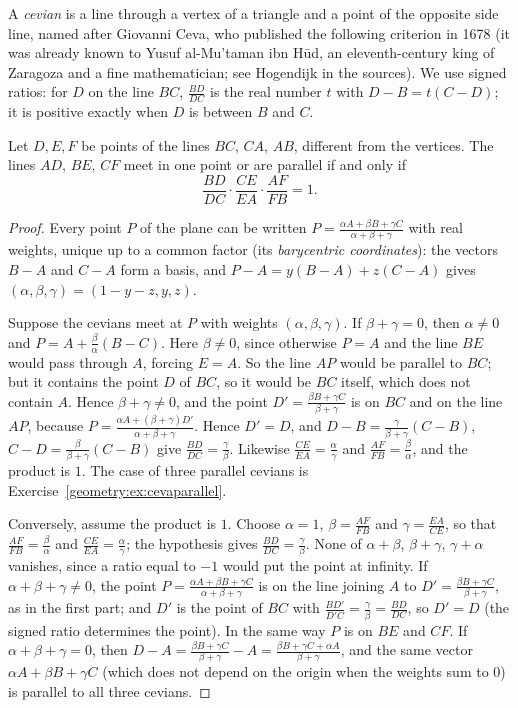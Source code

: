 A \emph{cevian} is a line through a vertex of a triangle and a point of the opposite side line, named after Giovanni Ceva, who
published the following criterion in 1678 (it was already known to Yusuf al-Mu'taman ibn H\=ud, an eleventh-century king of Zaragoza
and a fine mathematician; see Hogendijk in the sources). We
use signed ratios: for $D$ on the line $BC$, $\frac{BD}{DC}$ is the real number $t$ with $D-B=t(C-D)$; it is positive exactly when $D$ is
between $B$ and $C$.

\begin{theorem}[Ceva]\label{geometry:thm:ceva}
Let $D,E,F$ be points of the lines $BC$, $CA$, $AB$, different from the vertices. The lines $AD$, $BE$, $CF$ meet in one point or are
parallel if and only if
\[
\frac{BD}{DC}\cdot\frac{CE}{EA}\cdot\frac{AF}{FB}=1 .
\]
\end{theorem}
\begin{proof}
Every point $P$ of the plane can be written $P=\frac{\alpha A+\beta B+\gamma C}{\alpha+\beta+\gamma}$ with real weights, unique up to a
common factor (its \emph{barycentric coordinates}): the vectors $B-A$ and $C-A$ form a basis, and $P-A=y(B-A)+z(C-A)$ gives
$(\alpha,\beta,\gamma)=(1-y-z,y,z)$.

Suppose the cevians meet at $P$ with weights $(\alpha,\beta,\gamma)$. If $\beta+\gamma=0$, then $\alpha\ne0$ and $P=A+\frac\beta\alpha(B-C)$.
Here $\beta\ne0$, since otherwise $P=A$ and the line $BE$ would pass through $A$, forcing $E=A$. So the line $AP$ would be parallel to
$BC$; but it contains the point $D$ of $BC$, so it would be $BC$ itself, which does not contain $A$. Hence $\beta+\gamma\neq0$, and the point $D'=\frac{\beta B+\gamma C}{\beta+\gamma}$ is on $BC$ and on the line $AP$, because
$P=\frac{\alpha A+(\beta+\gamma)D'}{\alpha+\beta+\gamma}$. Hence $D'=D$, and $D-B=\frac{\gamma}{\beta+\gamma}(C-B)$, $C-D=\frac{\beta}{\beta+\gamma}(C-B)$ give
$\frac{BD}{DC}=\frac\gamma\beta$. Likewise $\frac{CE}{EA}=\frac\alpha\gamma$ and $\frac{AF}{FB}=\frac\beta\alpha$, and the product is $1$. The case of
three parallel cevians is Exercise~\ref{geometry:ex:cevaparallel}.

Conversely, assume the product is $1$. Choose $\alpha=1$, $\beta=\frac{AF}{FB}$ and $\gamma=\frac{EA}{CE}$, so that
$\frac{AF}{FB}=\frac\beta\alpha$ and $\frac{CE}{EA}=\frac\alpha\gamma$; the hypothesis gives $\frac{BD}{DC}=\frac\gamma\beta$. None of $\alpha+\beta$,
$\beta+\gamma$, $\gamma+\alpha$ vanishes, since a ratio equal to $-1$ would put the point at infinity. If $\alpha+\beta+\gamma\ne0$,
the point $P=\frac{\alpha A+\beta B+\gamma C}{\alpha+\beta+\gamma}$ is on the line joining $A$ to $D'=\frac{\beta B+\gamma C}{\beta+\gamma}$, as in the
first part; and $D'$ is the point of $BC$ with $\frac{BD'}{D'C}=\frac\gamma\beta=\frac{BD}{DC}$, so $D'=D$ (the signed ratio determines the point).
In the same way $P$ is on $BE$ and $CF$.
If $\alpha+\beta+\gamma=0$, then $D-A=\frac{\beta B+\gamma C}{\beta+\gamma}-A=\frac{\beta B+\gamma C+\alpha A}{\beta+\gamma}$, and the same
vector $\alpha A+\beta B+\gamma C$ (which does not depend on the origin when the weights sum to $0$) is parallel to all three
cevians.
\end{proof}

